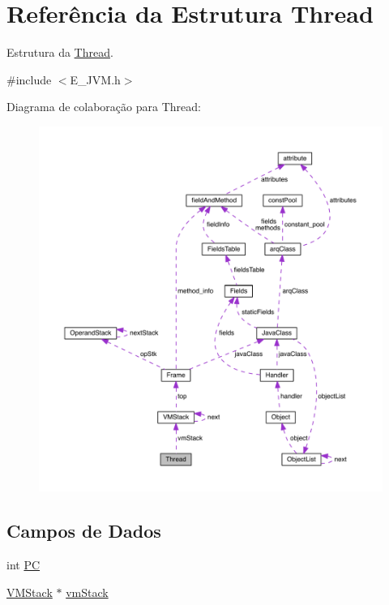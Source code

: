 \hypertarget{struct_thread}{}\section{Referência da Estrutura Thread}
\label{struct_thread}


Estrutura da \hyperlink{struct_thread}{Thread}.  




{\ttfamily \#include $<$E\+\_\+\+J\+V\+M.\+h$>$}



Diagrama de colaboração para Thread\+:\nopagebreak
\begin{figure}[H]
\begin{center}
\leavevmode
\includegraphics[width=350pt]{struct_thread__coll__graph}
\end{center}
\end{figure}
\subsection*{Campos de Dados}
\begin{DoxyCompactItemize}
\item 
int \hyperlink{struct_thread_acbbbde7dd2d37d9536513e2cdbae37f6}{P\+C}
\item 
\hyperlink{struct_v_m_stack}{V\+M\+Stack} $\ast$ \hyperlink{struct_thread_a14942cb194dc5185288e629c6da5ac3a}{vm\+Stack}
\end{DoxyCompactItemize}


